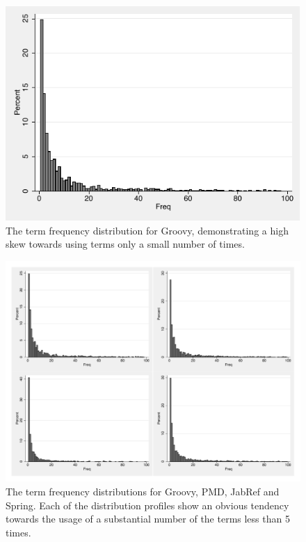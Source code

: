\begin{figure}[t]
\centering
\includegraphics[width=\textwidth]{Figures/Vocab-GroovyFreqDist.pdf}
\caption{The term frequency distribution for Groovy, demonstrating a high skew towards using terms only a small number of times.}
\label{fig:vocab-freq-dist-groovy}
\end{figure}

\begin{figure}[t]
\centering
\includegraphics[width=\textwidth]{Figures/Vocab-FrequencyDistComparison.pdf}
\caption{The term frequency distributions for Groovy, PMD, JabRef and Spring. Each of the distribution profiles show an obvious tendency towards the usage of a substantial number of the terms less than 5 times.}
\label{fig:vocab-freq-dist-comparison}
\end{figure}

